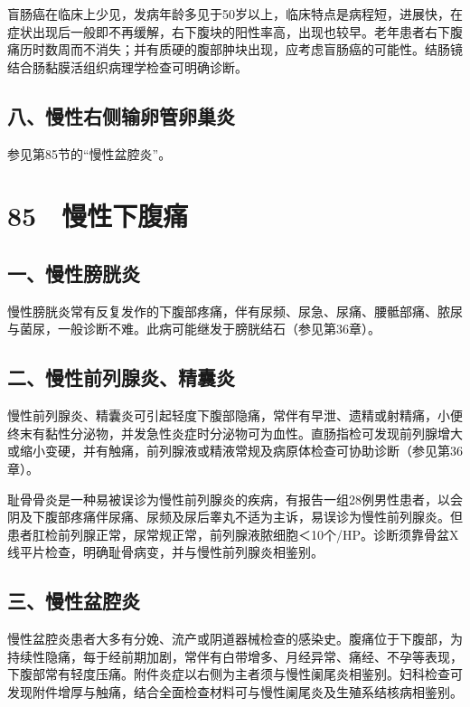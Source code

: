 盲肠癌在临床上少见，发病年龄多见于50岁以上，临床特点是病程短，进展快，在症状出现后一般即不再缓解，右下腹块的阳性率高，出现也较早。老年患者右下腹痛历时数周而不消失；并有质硬的腹部肿块出现，应考虑盲肠癌的可能性。结肠镜结合肠黏膜活组织病理学检查可明确诊断。

\subsection{八、慢性右侧输卵管卵巢炎}

参见第85节的“慢性盆腔炎”。

\protect\hypertarget{text00208.html}{}{}

\section{85　慢性下腹痛}

\subsection{一、慢性膀胱炎}

慢性膀胱炎常有反复发作的下腹部疼痛，伴有尿频、尿急、尿痛、腰骶部痛、脓尿与菌尿，一般诊断不难。此病可能继发于膀胱结石（参见第36章）。

\subsection{二、慢性前列腺炎、精囊炎}

慢性前列腺炎、精囊炎可引起轻度下腹部隐痛，常伴有早泄、遗精或射精痛，小便终末有黏性分泌物，并发急性炎症时分泌物可为血性。直肠指检可发现前列腺增大或缩小变硬，并有触痛，前列腺液或精液常规及病原体检查可协助诊断（参见第36章）。

耻骨骨炎是一种易被误诊为慢性前列腺炎的疾病，有报告一组28例男性患者，以会阴及下腹部疼痛伴尿痛、尿频及尿后睾丸不适为主诉，易误诊为慢性前列腺炎。但患者肛检前列腺正常，尿常规正常，前列腺液脓细胞＜10个/HP。诊断须靠骨盆X线平片检查，明确耻骨病变，并与慢性前列腺炎相鉴别。

\subsection{三、慢性盆腔炎}

慢性盆腔炎患者大多有分娩、流产或阴道器械检查的感染史。腹痛位于下腹部，为持续性隐痛，每于经前期加剧，常伴有白带增多、月经异常、痛经、不孕等表现，下腹部常有轻度压痛。附件炎症以右侧为主者须与慢性阑尾炎相鉴别。妇科检查可发现附件增厚与触痛，结合全面检查材料可与慢性阑尾炎及生殖系结核病相鉴别。

